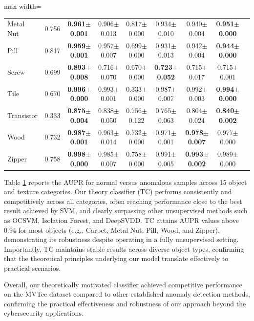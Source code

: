 \documentclass{article}
\begin{document}
\begin{table}[t]
\begin{adjustbox}{max width=\textwidth}
\begin{tabular}{lcccccccc}
        Metal Nut & 0.756 & \bf{0.961$\pm$0.001} & 0.906$\pm$0.013 & 0.817$\pm$0.000 & 0.934$\pm$0.010 & 0.940$\pm$0.004 & \bf{0.951$\pm$0.000} \\
        Pill & 0.817 & \bf{0.959$\pm$0.001} & 0.957$\pm$0.007 & 0.699$\pm$0.000 & 0.931$\pm$0.013 & 0.942$\pm$0.004 & \bf{0.944$\pm$0.000} \\
        Screw & 0.699 & \bf{0.893$\pm$0.008} & 0.716$\pm$0.070 & 0.670$\pm$0.000 & \bf{0.723$\pm$0.052} & 0.715$\pm$0.017 & 0.715$\pm$0.001 \\
        Tile & 0.670 & \bf{0.996$\pm$0.000} & 0.993$\pm$0.001 & 0.333$\pm$0.000 & 0.987$\pm$0.007 & 0.992$\pm$0.003 & \bf{0.994$\pm$0.000} \\
        Transistor & 0.333 & \bf{0.875$\pm$0.004} & 0.838$\pm$0.050 & 0.756$\pm$0.122 & 0.765$\pm$0.063 & 0.804$\pm$0.024 & \bf{0.840$\pm$0.002} \\
        Wood & 0.732 & \bf{0.987$\pm$0.001} & 0.963$\pm$0.014 & 0.732$\pm$0.000 & 0.971$\pm$0.001 & \bf{0.978$\pm$0.007} & 0.977$\pm$0.000 \\
        Zipper & 0.758 & \bf{0.998$\pm$0.000} & 0.985$\pm$0.007 & 0.758$\pm$0.000 & 0.991$\pm$0.005 & \bf{0.993$\pm$0.002} & 0.989$\pm$0.000 \\
        \bottomrule
    \end{tabular}
    \end{adjustbox}
    \label{tab:mvtec_vertical}
\end{table}

Table \ref{tab:mvtec_vertical} reports the AUPR  for normal versus anomalous samples across 15 object and texture categories. Our theory classifier (TC) performs consistently and competitively across all categories, often reaching performance close to the best result achieved by SVM, and clearly surpassing other unsupervised methods such as OCSVM, Isolation Forest, and DeepSVDD. TC attains AUPR values above 0.94 for most objects (e.g., Carpet, Metal Nut, Pill, Wood, and Zipper), demonstrating its robustness despite operating in a fully unsupervised setting. Importantly, TC maintains stable results across diverse object types, confirming that the theoretical principles underlying our model translate effectively to practical scenarios. 

Overall, our theoretically motivated classifier achieved competitive performance on the MVTec dataset compared to other established anomaly detection methods, confirming the practical effectiveness and robustness of our approach beyond the cybersecurity applications. 
\end{document}

